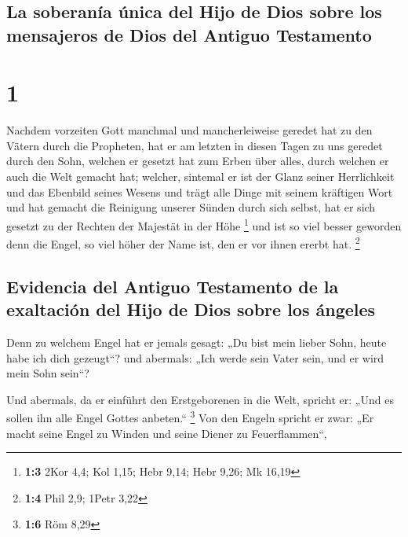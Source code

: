 \hypertarget{la-soberanuxeda-uxfanica-del-hijo-de-dios-sobre-los-mensajeros-de-dios-del-antiguo-testamento}{%
\subsection{La soberanía única del Hijo de Dios sobre los mensajeros de
Dios del Antiguo
Testamento}\label{la-soberanuxeda-uxfanica-del-hijo-de-dios-sobre-los-mensajeros-de-dios-del-antiguo-testamento}}

\hypertarget{section}{%
\section{1}\label{section}}

 Nachdem vorzeiten Gott manchmal und mancherleiweise
geredet hat zu den Vätern durch die Propheten,  hat er am
letzten in diesen Tagen zu uns geredet durch den Sohn, welchen er
gesetzt hat zum Erben über alles, durch welchen er auch die Welt gemacht
hat;  welcher, sintemal er ist der Glanz seiner
Herrlichkeit und das Ebenbild seines Wesens und trägt alle Dinge mit
seinem kräftigen Wort und hat gemacht die Reinigung unserer Sünden durch
sich selbst, hat er sich gesetzt zu der Rechten der Majestät in der Höhe
\footnote{\textbf{1:3} 2Kor 4,4; Kol 1,15; Hebr 9,14; Hebr 9,26; Mk
  16,19}  und ist so viel besser geworden denn die Engel,
so viel höher der Name ist, den er vor ihnen ererbt hat. \footnote{\textbf{1:4}
  Phil 2,9; 1Petr 3,22}

\hypertarget{evidencia-del-antiguo-testamento-de-la-exaltaciuxf3n-del-hijo-de-dios-sobre-los-uxe1ngeles}{%
\subsection{Evidencia del Antiguo Testamento de la exaltación del Hijo
de Dios sobre los
ángeles}\label{evidencia-del-antiguo-testamento-de-la-exaltaciuxf3n-del-hijo-de-dios-sobre-los-uxe1ngeles}}

 Denn zu welchem Engel hat er jemals gesagt: „Du bist mein
lieber Sohn, heute habe ich dich gezeugt``? und abermals: „Ich werde
sein Vater sein, und er wird mein Sohn sein``?

 Und abermals, da er einführt den Erstgeborenen in die
Welt, spricht er: „Und es sollen ihn alle Engel Gottes anbeten.``
\footnote{\textbf{1:6} Röm 8,29}  Von den Engeln spricht
er zwar: „Er macht seine Engel zu Winden und seine Diener zu
Feuerflammen``,

